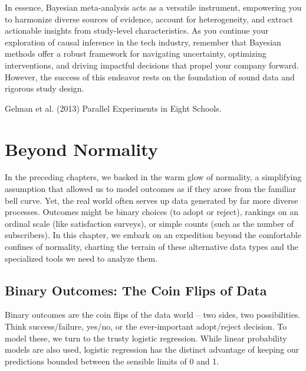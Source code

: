 \documentclass[
  letterpaper,
  DIV=11,
  numbers=noendperiod]{scrreprt}
\begin{document}
In essence, Bayesian meta-analysis acts as a versatile instrument,
empowering you to harmonize diverse sources of evidence, account for
heterogeneity, and extract actionable insights from study-level
characteristics. As you continue your exploration of causal inference in
the tech industry, remember that Bayesian methods offer a robust
framework for navigating uncertainty, optimizing interventions, and
driving impactful decisions that propel your company forward. However,
the success of this endeavor rests on the foundation of sound data and
rigorous study design.

\begin{tcolorbox}[enhanced jigsaw, colframe=quarto-callout-tip-color-frame, left=2mm, toprule=.15mm, colbacktitle=quarto-callout-tip-color!10!white, title=\textcolor{quarto-callout-tip-color}{\faLightbulb}\hspace{0.5em}{Learn more}, coltitle=black, rightrule=.15mm, leftrule=.75mm, colback=white, arc=.35mm, bottomtitle=1mm, bottomrule=.15mm, breakable, titlerule=0mm, opacitybacktitle=0.6, toptitle=1mm, opacityback=0]

Gelman et al. (2013) Parallel Experiments in Eight Schools.

\end{tcolorbox}

\chapter{Beyond Normality}\label{beyond-normality}

In the preceding chapters, we basked in the warm glow of normality, a
simplifying assumption that allowed us to model outcomes as if they
arose from the familiar bell curve. Yet, the real world often serves up
data generated by far more diverse processes. Outcomes might be binary
choices (to adopt or reject), rankings on an ordinal scale (like
satisfaction surveys), or simple counts (such as the number of
subscribers). In this chapter, we embark on an expedition beyond the
comfortable confines of normality, charting the terrain of these
alternative data types and the specialized tools we need to analyze
them.

\section{Binary Outcomes: The Coin Flips of
Data}\label{binary-outcomes-the-coin-flips-of-data}

Binary outcomes are the coin flips of the data world -- two sides, two
possibilities. Think success/failure, yes/no, or the ever-important
adopt/reject decision. To model these, we turn to the trusty logistic
regression. While linear probability models are also used, logistic
regression has the distinct advantage of keeping our predictions bounded
between the sensible limits of 0 and 1.
\end{document}

